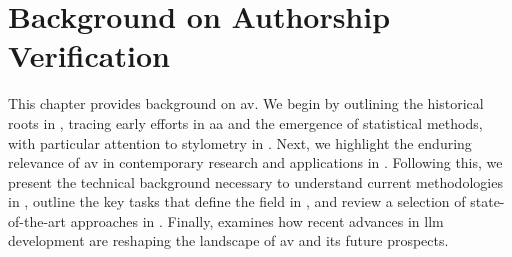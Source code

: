 \chapter{Background on Authorship Verification}
\label{chap:authorship_identification}

This chapter provides background on \acf{av}.
We begin by outlining the historical roots in , tracing early efforts in \ac{aa} and the emergence of statistical methods, with particular attention to stylometry in .
Next, we highlight the enduring relevance of \ac{av} in contemporary research and applications in .
Following this, we present the technical background necessary to understand current methodologies in , outline the key tasks that define the field in , and review a selection of state-of-the-art approaches in .
Finally,  examines how recent advances in \ac{llm} development are reshaping the landscape of \ac{av} and its future prospects.










% 



